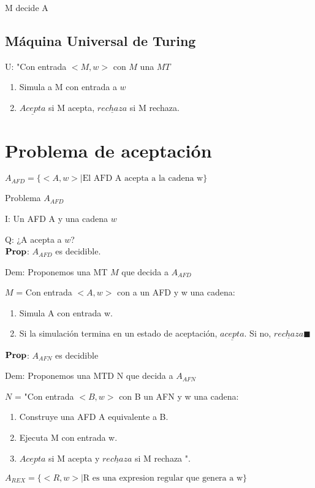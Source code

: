 \documentclass{homework}
\begin{document}
M decide A 

\subsection{Máquina Universal de Turing }

U: "Con entrada $<M,w>$ con $M$ una $MT$
 \begin{enumerate}
 	\item Simula a M con entrada a $w$
 	\item $\underline{Acepta}$ si M acepta, $\underline{rechaza}$ si M rechaza.
 \end{enumerate}

\section{Problema de aceptaci\'on}

$A_{AFD} = \{<A,w> | \text{El AFD A acepta a la cadena w}\}$

Problema $A_{AFD}$

I: Un AFD A y una cadena $w$

Q: ¿A acepta a $w$?\\

$\bf{Prop}$: $A_{AFD}$ es decidible.

Dem: Proponemos una MT $M$ que decida a $A_{AFD}$

$M$ = Con entrada $<A,w>$ con a un AFD y w una cadena:
\begin{enumerate}
	\item Simula A con entrada w.
	\item Si la simulación termina en un estado de aceptación, $\underline{acepta}$. Si no, $\underline{rechaza} \blacksquare$
\end{enumerate}

$\bf{Prop}$: $A_{AFN}$ es decidible

Dem: Proponemos una MTD N que decida a $A_{AFN}$

$N$ = "Con entrada $<B, w>$ con B un AFN y w una cadena:
\begin{enumerate}
	\item Construye una AFD A equivalente a B.
	\item Ejecuta M con entrada w.
	\item $\underline{Acepta}$ si M acepta y $\underline{rechaza}$ si M rechaza ".
\end{enumerate}

$A_{REX} = \{<R,w> | \text{R es una expresion regular que genera a w} \}$
\end{document}
